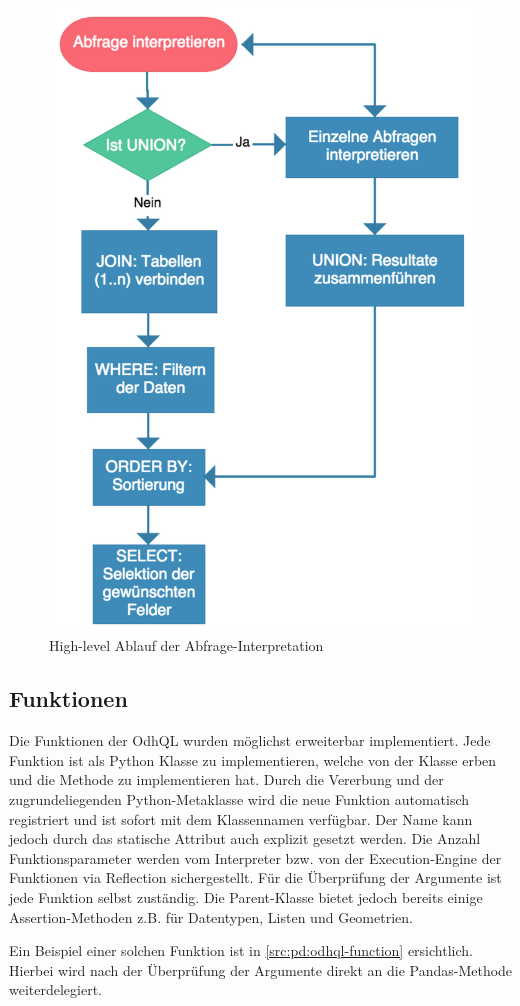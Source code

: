 \begin{figure}[H]
\centering
\includegraphics[width=0.6\linewidth]{fig/odhql-flow.pdf}
\caption{High-level Ablauf der Abfrage-Interpretation}
\label{fig:pd:odhql-flow}
\end{figure}


\subsection{Funktionen}
Die Funktionen der OdhQL wurden möglichst erweiterbar implementiert. Jede Funktion ist als Python Klasse zu implementieren, welche von der Klasse  erben und die Methode  zu implementieren hat. Durch die Vererbung und der zugrundeliegenden Python-Metaklasse wird die neue Funktion automatisch registriert und ist sofort mit dem Klassennamen verfügbar. Der Name kann jedoch durch das statische Attribut  auch explizit gesetzt werden. Die Anzahl Funktionsparameter werden vom Interpreter bzw. von der Execution-Engine der Funktionen via Reflection sichergestellt. Für die Überprüfung der Argumente ist jede Funktion selbst zuständig. Die Parent-Klasse bietet jedoch bereits einige Assertion-Methoden z.B. für Datentypen, Listen und Geometrien.

Ein Beispiel einer solchen Funktion ist in \cref{src:pd:odhql-function} ersichtlich. Hierbei wird nach der Überprüfung der Argumente direkt an die Pandas-Methode  weiterdelegiert.


